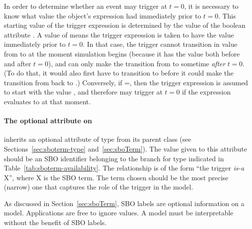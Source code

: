 In order to determine whether an event may trigger at $t = 0$, it is
necessary to know what value the \Trigger object's 
expression had immediately prior to $t = 0$.  This starting value
of the trigger expression is determined by the value of the
boolean attribute .  A value of 
means the trigger expression is taken to have the value 
immediately prior to $t = 0$.  In that case, the trigger cannot
transition in value from  to  at the moment
simulation begins (because it has the value  both before
and after $t = 0$), and can only make the transition from
 to  sometime \emph{after} $t = 0$.  (To do
that, it would also first have to transition to  before
it could make the transition from  back to .)
Conversely, if =, then the trigger
expression is assumed to start with the value , and
therefore may trigger at $t = 0$ if the expression evaluates to
 at that moment.

%


\paragraph{The optional  attribute on \Trigger}
\label{sec:trigger-sboterm}

\Trigger inherits an optional  attribute of type
 from its parent class \SBase (see
Sections~\ref{sec:sboterm-type} and~\ref{sec:sboTerm}).  The value
given to this attribute should be an SBO identifier belonging to
the branch for type \Trigger indicated in
Table~\ref{tab:sboterm-availability}.  The relationship is of the
form ``the trigger \emph{is-a} X'', where X is the SBO term.  The
term chosen should be the most precise (narrow) one that captures
the role of the trigger in the model.

As discussed in Section~\ref{sec:sboTerm}, SBO labels are optional
information on a model.  Applications are free to ignore
 values.  A model must be interpretable without the
benefit of SBO labels.

